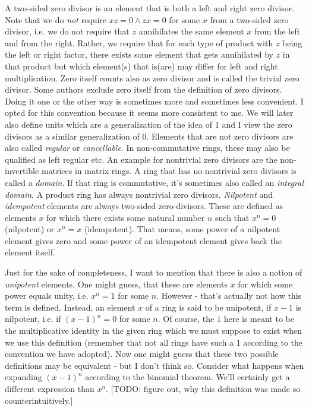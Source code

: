 A two-sided zero divisor is an element that is both a left and right zero divisor. Note that we do \emph{not} require $x z = 0 \wedge z x = 0$ for some $x$ from a two-sided zero divisor, i.e. we do not require that $z$ annihilates the same element $x$ from the left and from the right. Rather, we require that for each type of product with $z$ being the left or right factor, there exists some element that gets annihilated by $z$ in that product but which element(s) that is(are) may differ for left and right multiplication. Zero itself counts also as zero divisor and is called the trivial zero divisor. Some authors exclude zero itself from the definition of zero divisors. Doing it one or the other way is sometimes more and sometimes less convenient. I opted for this convention because it seems more consistent to me. We will later also define units which are a generalization of the idea of 1 and I view the zero divisors as a similar generalization of 0. Elements that are not zero divisors are also called \emph{regular} or \emph{cancellable}. In non-commutative rings, these may also be qualified as left regular etc. An example for nontrivial zero divisors are the non-invertible matrices in matrix rings. A ring that has no nontrivial zero divisors is called a \emph{domain}. If that ring is commutative, it's sometimes also called an \emph{integral domain}. A product ring has always nontrivial zero divisors. \emph{Nilpotent} and \emph{idempotent} elements are always two-sided zero-divisors. These are defined as elements $x$ for which there exists some natural number $n$ such that $x^n = 0$ (nilpotent) or $x^n = x$ (idempotent). That means, some power of a nilpotent element gives zero and some power of an idempotent element gives back the element itself. 

\medskip
Just for the sake of completeness, I want to mention that there is also a notion of \emph{unipotent} elements. One might guess, that these are elements $x$ for which some power equals unity, i.e. $x^n = 1$ for some $n$. However - that's actually not how this term is defined. Instead, an element $x$ of a ring is said to be unipotent, if $x-1$ is nilpotent, i.e. if $(x-1)^n = 0$ for some $n$. Of course, the $1$ here is meant to be the multiplicative identity in the given ring which we must suppose to exist when we use this definition (remember that not all rings have such a $1$ according to the convention we have adopted). Now one might guess that these two possible definitions may be equivalent - but I don't think so. Consider what happens when expanding $(x-1)^n$ according to the binomial theorem. We'll certainly get a different expression than $x^n$. [TODO: figure out, why this definition was made so counterintuitively.]

